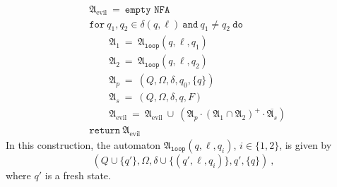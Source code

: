 \begin{solution}
\begin{enumerate}[(a)]
    \begin{align*}
      & \mathfrak{A}_{\text{evil}} ~=~ \texttt{empty NFA} \\
      & \texttt{for}~ q_1,q_2 \in \delta(q,\ell) ~\texttt{and}~ q_1 \neq q_2~\texttt{do} \\
      & \qquad \mathfrak{A}_1 ~=~ \mathfrak{A}_{\texttt{loop}}(q,\ell,q_1) \\
      & \qquad \mathfrak{A}_2 ~=~ \mathfrak{A}_{\texttt{loop}}(q,\ell,q_2) \\
      & \qquad \mathfrak{A}_p ~=~ (Q,\Omega,\delta,q_0,\{q\}) \\
      & \qquad \mathfrak{A}_s ~=~ (Q,\Omega,\delta,q,F) \\
      & \qquad \mathfrak{A}_{\text{evil}} ~=~ \mathfrak{A}_{\text{evil}} ~\cup~ \left( \mathfrak{A}_p \cdot (\mathfrak{A}_1 \cap \mathfrak{A}_2)^{+} \cdot \overline{\mathfrak{A}_s} \right) \\
      & \texttt{return}~\mathfrak{A}_{\text{evil}}
    \end{align*}
    In this construction, the automaton $\mathfrak{A}_{\texttt{loop}}(q,\ell,q_i)$, $i \in \{1,2\}$, is given by
    \[ (Q \cup \{q'\}, \Omega, \delta \cup \{(q',\ell,q_i)\}, q', \{q\})~, \]
    where $q'$ is a fresh state.
\end{enumerate}

\end{solution}

